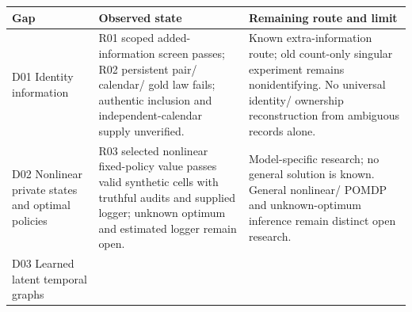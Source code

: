 \documentclass[
  10pt,
]{article}
\begin{document}
\begin{longtable}[]{@{}>{\raggedright\arraybackslash}p{}>{\raggedright\arraybackslash}p{}>{\raggedright\arraybackslash}p{}@{}}
\toprule
\begin{minipage}[b]{\linewidth}\raggedright
Gap\strut
\end{minipage} & \begin{minipage}[b]{\linewidth}\raggedright
Observed state\strut
\end{minipage} & \begin{minipage}[b]{\linewidth}\raggedright
Remaining route and limit\strut
\end{minipage}\tabularnewline
\midrule
\endhead
\begin{minipage}[t]{\linewidth}\raggedright
D01 Identity information\strut
\end{minipage} & \begin{minipage}[t]{\linewidth}\raggedright
R01 scoped added-information screen passes; R02 persistent pair/
calendar/ gold law fails; authentic inclusion and independent-calendar
supply unverified.\strut
\end{minipage} & \begin{minipage}[t]{\linewidth}\raggedright
Known extra-information route; old count-only singular experiment
remains nonidentifying. No universal identity/ ownership reconstruction
from ambiguous records alone.\strut
\end{minipage}\tabularnewline
\begin{minipage}[t]{\linewidth}\raggedright
D02 Nonlinear private states and optimal policies\strut
\end{minipage} & \begin{minipage}[t]{\linewidth}\raggedright
R03 selected nonlinear fixed-policy value passes valid synthetic cells
with truthful audits and supplied logger; unknown optimum and estimated
logger remain open.\strut
\end{minipage} & \begin{minipage}[t]{\linewidth}\raggedright
Model-specific research; no general solution is known. General
nonlinear/ POMDP and unknown-optimum inference remain distinct open
research.\strut
\end{minipage}\tabularnewline
\begin{minipage}[t]{\linewidth}\raggedright
D03 Learned latent temporal graphs\strut
\end{minipage} & \begin{minipage}[t]{\linewidth}\raggedright

\end{minipage}
\end{longtable}
\end{document}
